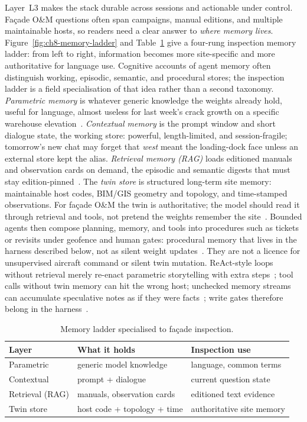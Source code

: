 Layer~L3 makes the stack durable across sessions and actionable under control. Fa\c{c}ade O\&M questions often span campaigns, manual editions, and multiple maintainable hosts, so readers need a clear answer to \emph{where memory lives}. Figure~\ref{fig:ch8-memory-ladder} and Table~\ref{tab:ch8-memory} give a four-rung inspection memory ladder: from left to right, information becomes more site-specific and more authoritative for language use. Cognitive accounts of agent memory often distinguish working, episodic, semantic, and procedural stores; the inspection ladder is a field specialisation of that idea rather than a second taxonomy. \emph{Parametric memory} is whatever generic knowledge the weights already hold, useful for language, almost useless for last week's crack growth on a specific warehouse elevation~\cite{brown2020}. \emph{Contextual memory} is the prompt window and short dialogue state, the working store: powerful, length-limited, and session-fragile; tomorrow's new chat may forget that \emph{west} meant the loading-dock face unless an external store kept the alias. \emph{Retrieval memory (RAG)} loads editioned manuals and observation cards on demand, the episodic and semantic digests that must stay edition-pinned~\cite{lewis2020,shuster2021,krutli2025fmrags}. The \emph{twin store} is structured long-term site memory: maintainable host codes, BIM/GIS geometry and topology, and time-stamped observations. For fa\c{c}ade O\&M the twin is authoritative; the model should read it through retrieval and tools, not pretend the weights remember the site~\cite{pan2024b,zhang2025}. Bounded agents then compose planning, memory, and tools into procedures such as tickets or revisits under geofence and human gates: procedural memory that lives in the harness described below, not as silent weight updates~\cite{wang2024surveyagents,li2024surveymultiagent,rawat2025llmmas,pan2026graphdtgpt,zhang2025llmagentschema}. They are not a licence for unsupervised aircraft command or silent twin mutation. ReAct-style loops without retrieval merely re-enact parametric storytelling with extra steps~\cite{yao2023react}; tool calls without twin memory can hit the wrong host; unchecked memory streams can accumulate speculative notes as if they were facts~\cite{park2023generativeagents}; write gates therefore belong in the harness~\cite{luo2025llmdtrobot,gao2026ifcagent}.

\begin{table}[htbp]
\centering
\caption{Memory ladder specialised to fa\c{c}ade inspection.}
\label{tab:ch8-memory}
\begin{tabular}{llp{5.2cm}}
\toprule
Layer & What it holds & Inspection use \\
\midrule
Parametric & generic model knowledge & language, common terms \\
Contextual & prompt + dialogue & current question state \\
Retrieval (RAG) & manuals, observation cards & editioned text evidence \\
Twin store & host code + topology + time & authoritative site memory \\
\bottomrule
\end{tabular}
\end{table}

